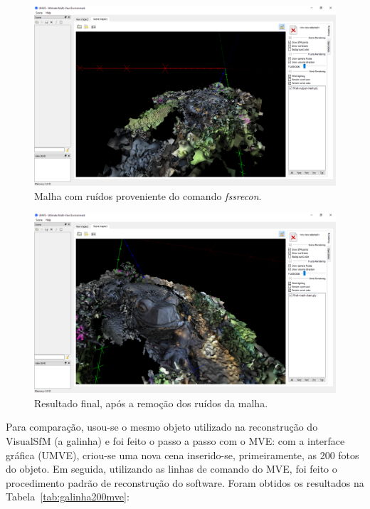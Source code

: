 \begin{figure}[!h]
	\centering
	\includegraphics[width=1\linewidth]{figs/mvemeshout.png}
	\caption{%
	Malha com ruídos proveniente do comando \emph{fssrecon}.
	}\label{fig:MVEFSSRMesh}
\end{figure} 

\begin{figure}[!h]
	\centering
	\includegraphics[width=1\linewidth]{figs/mvemeshclean.png}
	\caption{%
	Resultado final, após a remoção dos ruídos da malha.
	}\label{fig:MVEMeshClean}
\end{figure} 

Para comparação, usou-se o mesmo objeto utilizado na reconstrução do VisualSfM (a
galinha) e foi feito o passo a passo com o MVE: com a interface gráfica (UMVE),
criou-se uma nova cena inserido-se, primeiramente, as 200 fotos do objeto. Em
seguida, utilizando as linhas de comando do MVE, foi feito o procedimento padrão
de reconstrução do software. Foram obtidos os resultados na Tabela~\ref{tab:galinha200mve}:

